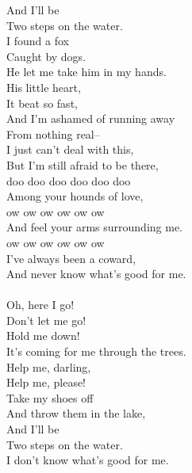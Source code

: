   And I'll be\\
  Two steps on the water.\\
  I found a fox\\
  Caught by dogs.\\
  He let me take him in my hands.\\
  His little heart,\\
  It beat so fast,\\
  And I'm ashamed of running away\\
  From nothing real--\\
  I just can't deal with this,\\
  But I'm still afraid to be there,\\
  doo doo doo doo doo doo\\
  Among your hounds of love,\\
  ow ow ow ow ow ow\\
  And feel your arms surrounding me.\\
  ow ow ow ow ow ow\\
  I've always been a coward,\\
  And never know what's good for me.\\
  \\
  Oh, here I go!\\
  Don't let me go!\\
  Hold me down!\\
  It's coming for me through the trees.\\
  Help me, darling,\\
  Help me, please!\\
  Take my shoes off\\
  And throw them in the lake,\\
  And I'll be\\
  Two steps on the water. \\
  I don't know what's good for me.\\

